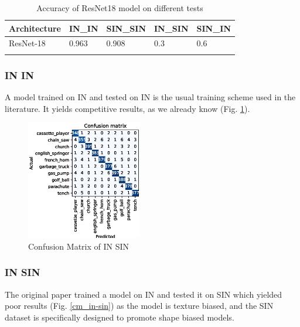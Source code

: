 \documentclass{article}
\begin{document}
\begin{table}[h!]
  \begin{tabular}{lllll}
  \Xhline{2\arrayrulewidth}
  Architecture & IN\_IN & SIN\_SIN & IN\_SIN & SIN\_IN \\ \hline
  ResNet-18    & 0.963    & 0.908      & 0.3     & 0.6     \\ \Xhline{2\arrayrulewidth}
  \end{tabular}
  \caption{Accuracy of ResNet18 model on different tests}
\end{table}


\subsubsection{IN \texorpdfstring{\textrightarrow} .IN}
A model trained on IN and tested on IN is the usual training scheme used in the literature.
It yields competitive results, as we already know (Fig. \ref{cm_in-in}).

\begin{figure}[h!]
  \includegraphics[width = 0.45\textwidth]{imgs/in/in-in/in-in_confusion_matrix_0.963.eps}
  \caption{Confusion Matrix of IN \texorpdfstring{\textrightarrow} .SIN}
  \label{cm_in-in}
\end{figure}

\subsubsection{IN \texorpdfstring{\textrightarrow} .SIN}



The original paper trained a model on IN and tested it on SIN which yielded poor results (Fig. \ref{cm_in-sin}) as 
the model is texture biased, and the SIN dataset is specifically designed to promote shape biased models.
\end{document}

